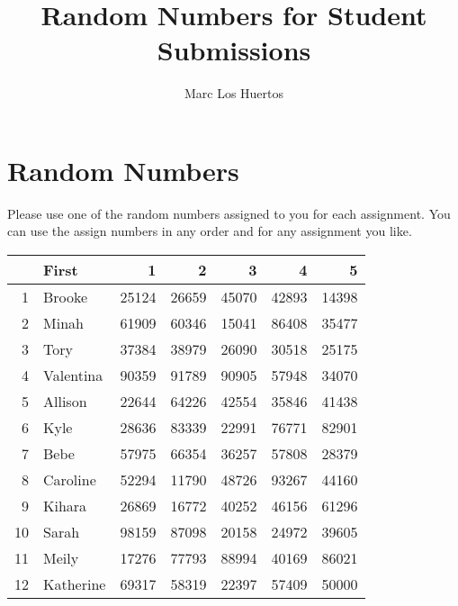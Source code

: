 \documentclass{article}\usepackage[]{graphicx}\usepackage[]{color}
\title{Random Numbers for Student Submissions}
\author{Marc Los Huertos}
\begin{document}
\maketitle


\section*{Random Numbers}

Please use one of the random numbers assigned to you for each assignment. You can use the assign numbers in any order and for any assignment you like. 

\begin{table}[ht]
\centering
\begin{tabular}{rlrrrrr}
  \hline
 & First & 1 & 2 & 3 & 4 & 5 \\ 
  \hline
1 & Brooke & 25124 & 26659 & 45070 & 42893 & 14398 \\ 
  2 & Minah & 61909 & 60346 & 15041 & 86408 & 35477 \\ 
  3 & Tory & 37384 & 38979 & 26090 & 30518 & 25175 \\ 
  4 & Valentina & 90359 & 91789 & 90905 & 57948 & 34070 \\ 
  5 & Allison & 22644 & 64226 & 42554 & 35846 & 41438 \\ 
  6 & Kyle & 28636 & 83339 & 22991 & 76771 & 82901 \\ 
  7 & Bebe & 57975 & 66354 & 36257 & 57808 & 28379 \\ 
  8 & Caroline & 52294 & 11790 & 48726 & 93267 & 44160 \\ 
  9 & Kihara & 26869 & 16772 & 40252 & 46156 & 61296 \\ 
  10 & Sarah & 98159 & 87098 & 20158 & 24972 & 39605 \\ 
  11 & Meily & 17276 & 77793 & 88994 & 40169 & 86021 \\ 
  12 & Katherine & 69317 & 58319 & 22397 & 57409 & 50000 \\ 
   \hline
\end{tabular}
\end{table}
\end{document}
